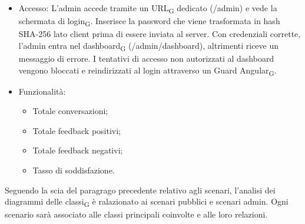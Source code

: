 \begin{itemize}
    \item Accesso:
    \newline \newline L'admin accede tramite un URL\textsubscript{G} dedicato (/admin) e vede la schermata di login\textsubscript{G}. Inserisce la password che viene trasformata in hash SHA-256 lato client prima di essere inviata al server. Con credenziali corrette, l'admin entra nel dashboard\textsubscript{G} (/admin/dashboard), altrimenti riceve un messaggio di errore. I tentativi di accesso non autorizzati al dashboard vengono bloccati e reindirizzati al login attraverso un Guard Angular\textsubscript{G}.
    \item Funzionalità:
    \begin{itemize}
        \item Totale conversazioni;
        \item Totale feedback positivi;
        \item Totale feedback negativi;
        \item Tasso di soddisfazione.
    \end{itemize}
\end{itemize}
Seguendo la scia del paragrago precedente relativo agli scenari, l'analisi dei diagrammi delle classi\textsubscript{G} è ralazionato ai scenari pubblici e scenari admin. Ogni scenario sarà associato alle classi principali coinvolte e alle loro relazioni.
